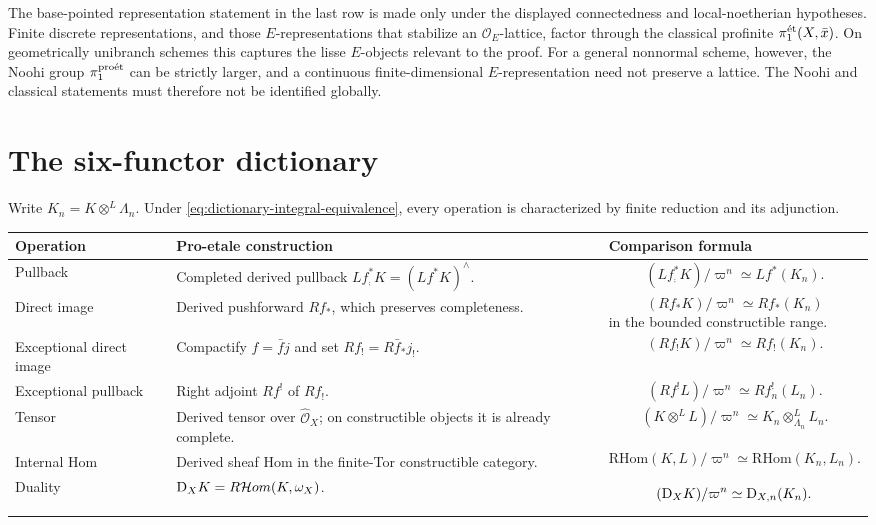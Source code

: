 The base-pointed representation statement in the last row is made only under
the displayed connectedness and local-noetherian hypotheses.  Finite
discrete representations, and those \(E\)-representations that stabilize an
\(\mathcal O_E\)-lattice, factor through the classical profinite
\(\pi_1^{\mathrm{\acute et}}(X,\bar x)\).  On geometrically unibranch schemes this captures
the lisse \(E\)-objects relevant to the proof.  For a general nonnormal
scheme, however, the Noohi group \(\pi_1^{\mathrm{pro\acute et}}\) can be strictly larger,
and a continuous finite-dimensional \(E\)-representation need not preserve a
lattice.  The Noohi and classical statements must therefore not be identified
globally.

\section{The six-functor dictionary}

Write \(K_n=K\otimes^L\Lambda_n\).  Under
\eqref{eq:dictionary-integral-equivalence}, every operation is characterized
by finite reduction and its adjunction.

\begin{longtable}{
 >{\raggedright\arraybackslash}p{}
 >{\raggedright\arraybackslash}p{}
 >{\raggedright\arraybackslash}p{}}
\toprule
Operation & Pro-etale construction & Comparison formula\\
\midrule
\endhead
Pullback &
Completed derived pullback
\(Lf_{\comp}^*K=(Lf^*K)^\wedge\). &
\[
 (Lf_{\comp}^*K)/\varpi^n
   \simeq Lf^*(K_n).
\]\\

Direct image &
Derived pushforward \(Rf_*\), which preserves completeness. &
\[
 (Rf_*K)/\varpi^n
   \simeq Rf_*(K_n)
\]
in the bounded constructible range.\\

Exceptional direct image &
Compactify \(f=\bar f j\) and set
\(Rf_!=R\bar f_*j_!\). &
\[
 (Rf_!K)/\varpi^n
   \simeq Rf_!(K_n).
\]\\

Exceptional pullback &
Right adjoint \(Rf^!\) of \(Rf_!\). &
\[
 (Rf^!L)/\varpi^n
   \simeq Rf_n^!(L_n).
\]\\

Tensor &
Derived tensor over \(\widehat{\mathcal O}_X\); on constructible objects it
is already complete. &
\[
 (K\otimes^LL)/\varpi^n
 \simeq K_n\otimes^L_{\Lambda_n}L_n.
\]\\

Internal Hom &
Derived sheaf Hom in the finite-Tor constructible category. &
{\small
\[
 \mathrm{RHom}(K,L)/\varpi^n
 \simeq \mathrm{RHom}(K_n,L_n).
\]
}\\

Duality &
\(\mathrm D_XK=R\mathcal Hom(K,\omega_X)\). &
\[
 (\mathrm D_XK)/\varpi^n
   \simeq\mathrm D_{X,n}(K_n).
\]\\
\bottomrule
\end{longtable}

